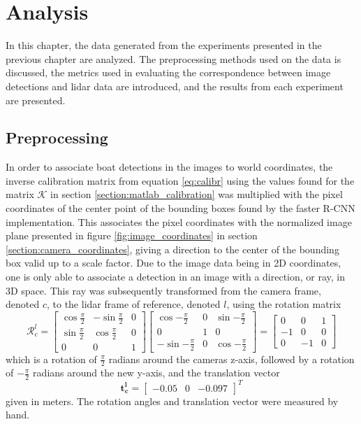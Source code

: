 
\chapter{Analysis}
In this chapter, the data generated from the experiments presented in the previous chapter are analyzed. The preprocessing methods used on the data is discussed, the metrics used in evaluating the correspondence between image detections and lidar data are introduced, and the results from each experiment are presented.
\section{Preprocessing}
In order to associate boat detections in the images to world coordinates, the inverse calibration matrix from equation \ref{eq:calibr} using the values found for the matrix $\mathcal{K}$ in section \ref{section:matlab_calibration} was multiplied with the pixel coordinates of the center point of the bounding boxes found by the faster R-CNN implementation. This associates the pixel coordinates with the normalized image plane presented in figure \ref{fig:image_coordinates} in section \ref{section:camera_coordinates}, giving a direction to the center of the bounding box valid up to a scale factor. Due to the image data being in 2D coordinates, one is only able to associate a detection in an image with a direction, or ray, in 3D space. This ray was subsequently transformed from the camera frame, denoted $c$, to the lidar frame of reference, denoted $l$, using the rotation matrix
\begin{equation}
\mathcal{R}_c^l=\begin{bmatrix}
\cos{\frac{\pi}{2}} & -\sin{\frac{\pi}{2}} & 0 \\
\sin{\frac{\pi}{2}} & \cos{\frac{\pi}{2}} & 0 \\
0 & 0 & 1
\end{bmatrix}\begin{bmatrix}
\cos{-\frac{\pi}{2}} & 0 & \sin{-\frac{\pi}{2}}\\
0 & 1 & 0 \\
-\sin{-\frac{\pi}{2}} & 0 & \cos{-\frac{\pi}{2}}
\end{bmatrix}=\begin{bmatrix}
0 & 0 & 1\\
-1 & 0 & 0\\
0 & -1 & 0
\end{bmatrix}
\end{equation}
which is a rotation of $\frac{\pi}{2}$ radians around the cameras z-axis, followed by a rotation of $-\frac{\pi}{2}$ radians around the new y-axis, and the translation vector
\begin{equation}
\mathbf{t_c^l}=\begin{bmatrix}
-0.05 & 0 & -0.097
\end{bmatrix}^T
\end{equation} 
given in meters. The rotation angles and translation vector were measured by hand.


